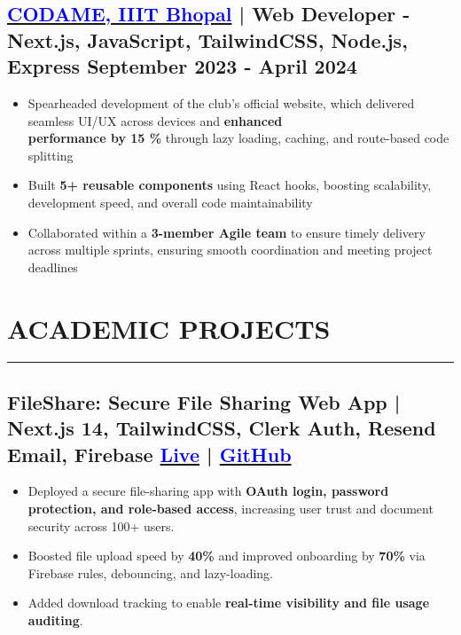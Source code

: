 \documentclass[a4paper]{article}
\newcommand{\sectionlineP}{
  \vspace{-2em} %
  \noindent\rule{\textwidth}{0.4pt}
  \vspace{-2em} %
}
\begin{document}
\subsection*{\href{https://codame.club/}{\textbf{\textcolor{blue}{CODAME, IIIT Bhopal}}} | Web Developer - Next.js, JavaScript, TailwindCSS, Node.js, Express \hfill September 2023 - April 2024}
\vspace{-0.5em}
\begin{itemize}[leftmargin=*]
    \item Spearheaded development of the club’s official website, which delivered seamless UI/UX across devices and \textbf{enhanced \\ performance by 15 \%} through lazy loading, caching, and route-based code splitting
    \vspace{-0.5em}
    \item Built \textbf{5+ reusable components} using React hooks, boosting scalability, development speed, and overall code maintainability
    \vspace{-0.5em}
    \item Collaborated within a \textbf{3-member Agile team} to ensure timely delivery across multiple sprints, ensuring smooth coordination and meeting project deadlines
\end{itemize}
\vspace{-1.25em}

\section*{ACADEMIC PROJECTS}
\sectionlineP
\vspace{-0.25em}

\subsection*{
  \textbf{FileShare: Secure File Sharing Web App | Next.js 14, TailwindCSS, Clerk Auth, Resend Email, Firebase}
  \hfill 
  \textnormal{
  \href{https://file-share-app-delta.vercel.app/}{\textcolor{blue}{Live}} |
  \href{https://github.com/aakash811/FileShare-App}{\textcolor{blue}{GitHub}}
}}
\vspace{-0.5em}
\begin{itemize}[leftmargin=*]
    \item Deployed a secure file-sharing app with \textbf{OAuth login, password protection, and role-based access}, increasing user trust and document security across 100+ users.
    \vspace{-0.5em}
    \item Boosted file upload speed by \textbf{40\%} and improved onboarding by \textbf{70\%} via Firebase rules, debouncing, and lazy-loading.
    \vspace{-0.5em}
    \item Added download tracking to enable \textbf{real-time visibility and file usage auditing}.
\end{itemize}
\end{document}
